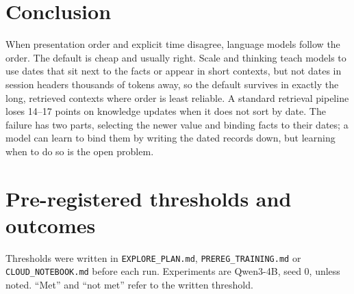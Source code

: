 \documentclass[11pt]{article}
\begin{document}
\section{Conclusion}
When presentation order and explicit time disagree, language models follow the order. The default is cheap and usually right. Scale and thinking teach models to use dates that sit next to the facts or appear in short contexts, but not dates in session headers thousands of tokens away, so the default survives in exactly the long, retrieved contexts where order is least reliable. A standard retrieval pipeline loses 14--17 points on knowledge updates when it does not sort by date. The failure has two parts, selecting the newer value and binding facts to their dates; a model can learn to bind them by writing the dated records down, but learning when to do so is the open problem.




\appendix

\section{Pre-registered thresholds and outcomes}
\label{app:scorecard}

Thresholds were written in \texttt{EXPLORE\_PLAN.md}, \texttt{PREREG\_TRAINING.md} or \texttt{CLOUD\_NOTEBOOK.md} before each run. Experiments are Qwen3-4B, seed 0, unless noted. ``Met'' and ``not met'' refer to the written threshold.
\end{document}
